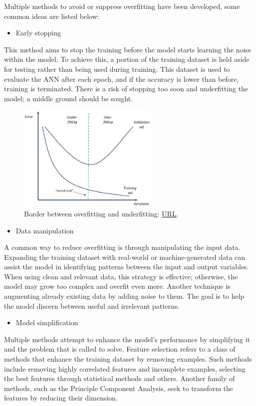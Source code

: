 Multiple methods to avoid or suppress overfitting have been developed, some common ideas are listed below:
\begin{itemize}
    \item Early stopping
\end{itemize}
This method aims to stop the training before the model starts learning the noise within the model. To achieve this, a portion of the training dataset is held aside for testing rather than being used during training. This dataset is used to evaluate the ANN after each epoch, and if the accuracy is lower than before, training is terminated. There is a risk of stopping too soon and underfitting the model; a middle ground should be sought.
\begin{figure}[H]
    \centering
        \includegraphics[width=0.6\textwidth]{Images/diagrams/classic_overfitting.png}
        \decoRule
        \caption[Overfitting/Underfitting]{Border between overfitting and underfitting: \href{https://www.ibm.com/cloud/learn/overfitting}{URL}.}
        \label{fig:Model Overfitting/Underfitting}
\end{figure}

\begin{itemize}[resume]
    \item Data manipulation
\end{itemize}
A common way to reduce overfitting is through manipulating the input data. Expanding the training dataset with real-world or machine-generated data can assist the model in identifying patterns between the input and output variables. When using clean and relevant data, this strategy is effective; otherwise, the model may grow too complex and overfit even more. Another technique is augmenting already existing data by adding noise to them. The goal is to help the model discern between useful and irrelevant patterns.

\begin{itemize}[resume]
    \item Model simplification
\end{itemize}
Multiple methods attempt to enhance the model's performance by simplifying it and the problem that is called to solve. Feature selection refers to a class of methods that enhance the training dataset by removing examples. Such methods include removing highly correlated features and incomplete examples, selecting the best features through statistical methods and others. Another family of methods, such as the Principle Component Analysis, seek to transform the features by reducing their dimension.


